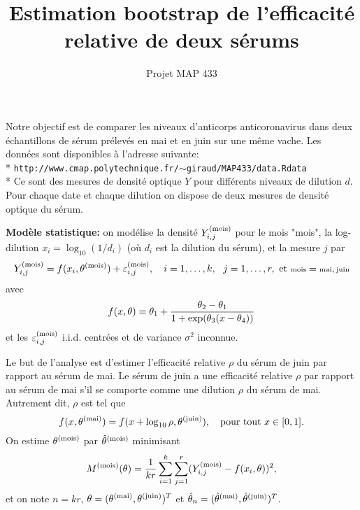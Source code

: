 \documentclass{article}
\title{\bf Estimation bootstrap de l'efficacit\'e relative de deux s\'erums}
\date{}
\author{Projet MAP 433}
\newcommand{\mois}{\textrm{\scriptsize mois}}
\newcommand{\mai}{\textrm{\scriptsize mai}}
\newcommand{\juin}{\textrm{\scriptsize juin}}
\begin{document}
\maketitle

\bigskip
Notre objectif est de comparer les niveaux d'anticorps anticoronavirus dans deux \'echantillons de s\'erum pr\'elev\'es en mai et en juin sur une m\^eme vache. Les donn\'ees sont disponibles \`a l'adresse suivante:\\* {\tt http://www.cmap.polytechnique.fr/$\sim$giraud/MAP433/data.Rdata} \\* 
Ce sont des mesures de densit\'e optique $Y$ pour diff\'erents niveaux de dilution $d$. Pour chaque date et chaque dilution on dispose de deux mesures de densit\'e optique du s\'erum. 

%
%
%
\bigskip

{\bf Mod\`ele statistique:} on mod\'elise la densit\'e $Y^{(\mois)}_{i,j}$ pour le mois "\textsf{mois}", la log-dilution $x_{i}=\log_{10}(1/d_i)$ (o\`u $d_{i}$ est la dilution du s\'erum),  et la mesure $j$ par
$$Y_{i,j}^{(\mois)}=f(x_{i},\theta^{(\mois)})+\varepsilon_{i,j}^{(\mois)}, \quad i=1,\ldots,k,\ \ j=1,\ldots,r,\ \textrm{et } \mois=\mai,\juin$$
avec 
$$f(x,\theta)=\theta_{1}+{\theta_{2}-\theta_{1}\over 1+\exp(\theta_{3}(x-\theta_{4}))}$$
et les $\varepsilon_{i,j}^{(\mois)}$ i.i.d. centr\'ees et de variance $\sigma^2$ inconnue. 

Le but de l'analyse est d'estimer l'efficacit\'e relative $\rho$ du s\'erum de juin par rapport au s\'erum de mai. Le s\'erum de juin a une efficacit\'e relative $\rho$ par rapport au s\'erum de mai s'il se comporte comme une dilution $\rho$ du s\'erum de mai. Autrement dit, $\rho$ est tel que 
\begin{equation}\label{hypo}
f(x,\theta^{(\mai)})=f(x+\log_{10}\rho,\theta^{(\juin)}),\quad \textrm{pour tout }x\in[0,1].
\end{equation}
On estime $\theta^{(\mois)}$ par $\hat\theta^{(\mois)}$ minimisant 
$$M^{(\mois)}(\theta)={1\over kr}\sum_{i=1}^k\sum_{j=1}^r(Y_{i,j}^{(\mois)}-f(x_{i},\theta))^{2},$$
et on note $n=kr$, $\theta=(\theta^{(\mai)},\theta^{(\juin)})^{T}$ et $\hat\theta_{n}=(\hat\theta^{(\mai)},\hat\theta^{(\juin)})^{T}$.
\end{document}
